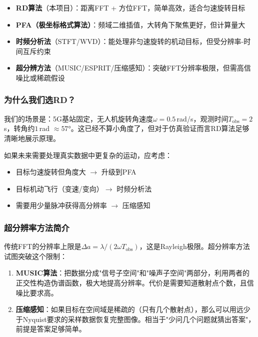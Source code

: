 \documentclass[12pt, a4paper]{article}
\begin{document}
\begin{warnbox}[方法对比速查]
\begin{itemize}
  \item \textbf{RD算法}（本项目）：距离FFT + 方位FFT，简单高效，适合匀速旋转目标
  \item \textbf{PFA（极坐标格式算法）}：频域二维插值，大转角下聚焦更好，但计算量大
  \item \textbf{时频分析法}（STFT/WVD）：能处理非匀速旋转的机动目标，但受分辨率-时间互斥约束
  \item \textbf{超分辨方法}（MUSIC/ESPRIT/压缩感知）：突破FFT分辨率极限，但需高信噪比或稀疏假设
\end{itemize}
\end{warnbox}

\subsubsection{为什么我们选RD？}

\begin{intubox}[选型逻辑]
我们的场景是：5G基站固定，无人机旋转角速度$\omega=0.5\,$rad/s，观测时间$T_\text{obs}=2\,$s，转角约$1\,$rad $\approx 57°$。这已经不算小角度了，但对于仿真验证而言RD算法足够清晰地展示原理。

如果未来需要处理真实数据中更复杂的运动，应考虑：
\begin{itemize}
  \item 目标匀速旋转但角度大 $\to$ 升级到PFA
  \item 目标机动飞行（变速/变向）$\to$ 时频分析法
  \item 需要用少量脉冲获得高分辨率 $\to$ 压缩感知
\end{itemize}
\end{intubox}

\subsubsection{超分辨率方法简介}

传统FFT的分辨率上限是$\Delta a = \lambda/(2\omega T_\text{obs})$，这是Rayleigh极限。超分辨率方法试图突破这个限制：

\begin{enumerate}
  \item \textbf{MUSIC算法}：把数据分成"信号子空间"和"噪声子空间"两部分，利用两者的正交性构造伪谱函数，极大地提高分辨率。代价是需要知道散射点个数，且信噪比要求高。
  \item \textbf{压缩感知}：如果目标在空间域是稀疏的（只有几个散射点），那么可以用远少于Nyquist要求的采样数据恢复完整图像。相当于"少问几个问题就猜出答案"，前提是答案足够简单。
\end{enumerate}
\end{document}
